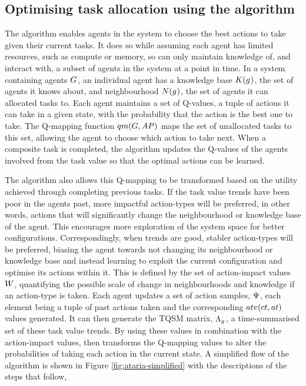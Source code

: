 \subsection{Optimising task allocation using the \acronymATARIA{}{} algorithm}

\label{section:algorithm_summaries}

The \acronymATARIA{}{} algorithm enables agents in the system to choose the best actions to take given their current tasks. It does so while assuming each agent has limited resources, such as compute or memory, so can only maintain knowledge of,  and interact with,  a subset of agents in the system at a point in time. In a system containing agents $G_{}^{}$, an individual agent has a knowledge base $\functionKnowledgeSignature{}{}$, the set of agents it knows about, and neighbourhood $\functionNeighbourhoodSignature{}{}$, the set of agents it can allocated tasks to. Each agent maintains a set of Q-values, a tuple of actions it can take in a given state, with the probability that the action is the best one to take. The  Q-mapping function $\functionQMappingSignature{}{}$ maps the set of unallocated tasks to this set, allowing the agent to choose which action to take next. When a composite task is completed, the algorithm updates the Q-values of the agents involved from the task value so that the optimal actions can be learned.

The \acronymATARIA{}{} algorithm also allows this Q-mapping to be transformed based on the utility achieved through completing previous tasks. If the task value trends have been poor in the agents past, more impactful action-types will be preferred, in other words, actions that will significantly change the neighbourhood or knowledge base of the agent. This encourages more exploration of the system space for better configurations. Correspondingly, when trends are good, stabler action-types will be preferred, biasing the agent towards not changing its neighbourhood or knowledge base and instead learning to exploit the current configuration and optimise its actions within it. This is defined by the set of action-impact values $\setRiskAction{}{}$, quantifying  the possible scale of change in neighbourhoods and knowledge if an action-type is taken. Each agent updates a set of action samples, $\setActionSample{}{}$, each element being a tuple of past actions taken and the corresponding $\functionTaskAbsoluteValue{}{}$ values generated. It can then generate the TQSM matrix, $\setRewardSet{\varAgent{}{}}{}$, a time-summarised set of these task value trends. By using these values in combination with the action-impact values, \acronymATARIA{}{} then transforms the Q-mapping values to alter the probabilities of taking each action in the current state. A simplified flow of the \acronymATARIA{}{} algorithm is shown in Figure \ref{fig:ataria-simplified} with the descriptions of the steps that follow,

